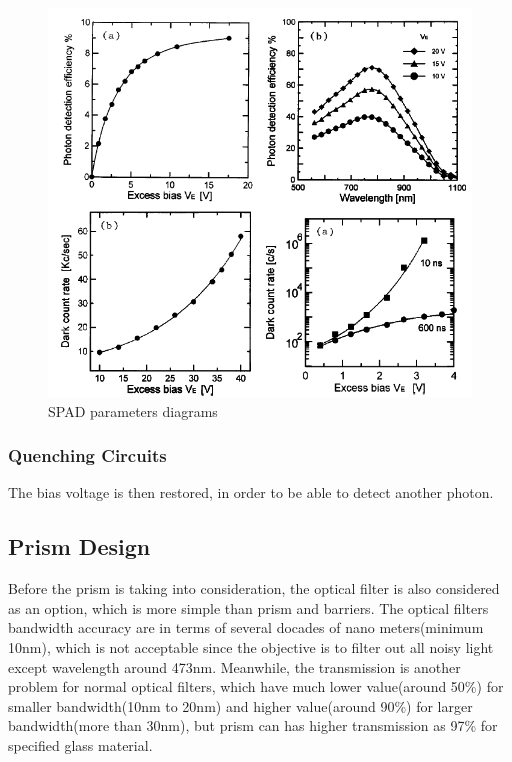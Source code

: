 \begin{figure} [ht]
\centering
\includegraphics[scale=0.8]{chapters/img/SPAD_Ve_functions.png}	
\caption{\acs{SPAD} parameters diagrams }
\label{spad}
\end{figure}

\subsubsection{Quenching Circuits}
\label{AQC}
The bias voltage is then restored, in order to be able to detect another photon. 	
 

\subsection{Prism Design}
\label{prism}
Before the prism is taking into consideration, the optical filter is also considered as an option, which is more simple than prism and barriers. The optical filters bandwidth accuracy are in terms of several docades of nano meters(minimum 10nm\cite{optical_filter}), which is not acceptable since the objective is to filter out all noisy light except wavelength around 473nm. Meanwhile, the transmission is another problem for normal optical filters, which have much lower value(around 50\%) for smaller bandwidth(10nm to 20nm) and higher value(around 90\%) for larger bandwidth(more than 30nm), but prism can has higher transmission as 97\% for specified glass material.

